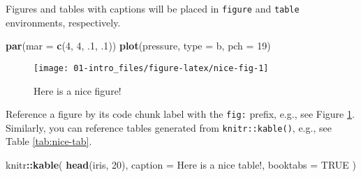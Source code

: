 \documentclass[
  lang=cn,
  11pt,
  scheme=chinese,
  chinesefont=nofont,
  bibstyle=apalike]{elegantbook}
\newenvironment{Shaded}{\begin{snugshade}}{\end{snugshade}}
\newcommand{\DataTypeTok}[1]{\textcolor[rgb]{0.13,0.29,0.53}{#1}}
\newcommand{\DecValTok}[1]{\textcolor[rgb]{0.00,0.00,0.81}{#1}}
\newcommand{\FloatTok}[1]{\textcolor[rgb]{0.00,0.00,0.81}{#1}}
\newcommand{\KeywordTok}[1]{\textcolor[rgb]{0.13,0.29,0.53}{\textbf{#1}}}
\newcommand{\NormalTok}[1]{#1}
\newcommand{\OperatorTok}[1]{\textcolor[rgb]{0.81,0.36,0.00}{\textbf{#1}}}
\newcommand{\OtherTok}[1]{\textcolor[rgb]{0.56,0.35,0.01}{#1}}
\newcommand{\StringTok}[1]{\textcolor[rgb]{0.31,0.60,0.02}{#1}}
\begin{document}
Figures and tables with captions will be placed in \texttt{figure} and \texttt{table} environments, respectively.

\begin{Shaded}
\begin{Highlighting}[]
\KeywordTok{par}\NormalTok{(}\DataTypeTok{mar =} \KeywordTok{c}\NormalTok{(}\DecValTok{4}\NormalTok{, }\DecValTok{4}\NormalTok{, }\FloatTok{.1}\NormalTok{, }\FloatTok{.1}\NormalTok{))}
\KeywordTok{plot}\NormalTok{(pressure, }\DataTypeTok{type =} \StringTok{\textquotesingle{}b\textquotesingle{}}\NormalTok{, }\DataTypeTok{pch =} \DecValTok{19}\NormalTok{)}
\end{Highlighting}
\end{Shaded}

\begin{figure}

{\centering \texttt{[image: 01-intro\_files/figure-latex/nice-fig-1]} 

}

\caption{Here is a nice figure!}\label{fig:nice-fig}
\end{figure}

Reference a figure by its code chunk label with the \texttt{fig:} prefix, e.g., see Figure \ref{fig:nice-fig}. Similarly, you can reference tables generated from \texttt{knitr::kable()}, e.g., see Table \ref{tab:nice-tab}.

\begin{Shaded}
\begin{Highlighting}[]
\NormalTok{knitr}\OperatorTok{::}\KeywordTok{kable}\NormalTok{(}
  \KeywordTok{head}\NormalTok{(iris, }\DecValTok{20}\NormalTok{), }\DataTypeTok{caption =} \StringTok{\textquotesingle{}Here is a nice table!\textquotesingle{}}\NormalTok{,}
  \DataTypeTok{booktabs =} \OtherTok{TRUE}
\NormalTok{)}
\end{Highlighting}
\end{Shaded}
\end{document}
